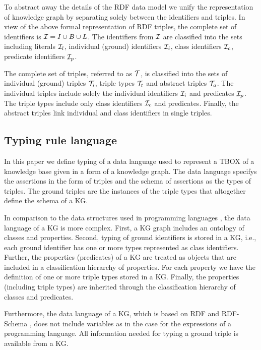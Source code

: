 \documentclass[runningheads]{llncs}
\newcommand{\I}{{\cal I}}
\newcommand{\T}{{\cal T}}
\begin{document}

To abstract away the details of the RDF data model we unify the
representation of knowledge graph by separating solely between the
identifiers and triples. In view of the above formal representation of
RDF triples, the complete set of identifiers is
$\I=I\cup\/B\cup\/L$. The identifiers from $\I$ are classified into
the sets including literals $\I_l$, individual (ground) identifiers
$\I_i$, class identifiers $\I_c$, predicate identifiers $\I_p$.

The complete set of triples, referred to as $\T$, is classified into
the sets of individual (ground) triples $\T_i$, triple types $\T_t$
and abstract triples $\T_a$. The individual triples include solely the
individual identifiers $\I_i$ and predicates $\I_p$. The triple types
include only class identifiers $\I_c$ and predicates. Finally, the
abstract triples link individual and class identifiers in single
triples.



\subsection{Typing rule language}

In this paper we define typing of a data language used to represent a
TBOX \cite{Brachman2004KnowledgeRR} of a knowledge base given in a
form of a knowledge graph. The data language specifys the assertions
in the form of triples and the schema of assertions as the types of
triples. The ground triples are the instances of the triple types that
altogether define the schema of a KG.

In comparison to the data structures used in programming languages
\cite{Pierce2002,Hindley1997}, the data language of a KG is more
complex. First, a KG graph includes an ontology of classes and
properties. Second, typing of ground identifiers is stored in a KG,
i.e., each ground identifier has one or more types represented as
class identifiers. Further, the properties (predicates) of a KG are
treated as objects that are included in a classification hierarchy of
properties. For each property we have the definition of one or more
triple types stored in a KG. Finally, the properties (including triple
types) are inherited through the classification hierarchy of classes
and predicates.

Furthermore, the data language of a KG, which is based on RDF and
RDF-Schema \cite{rdf,rdfschema}, does not include variables as in
the case for the expressions of a programming language. All
information needed for typing a ground triple is available from a KG.
\end{document}
